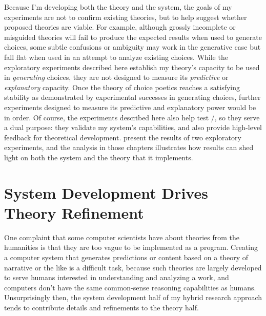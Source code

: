 Because I'm developing both the theory and the system, the goals of my experiments are not to confirm existing theories, but to help suggest whether proposed theories are viable.
%
For example, although grossly incomplete or misguided theories will fail to produce the expected results when used to generate choices, some subtle confusions or ambiguity may work in the generative case but fall flat when used in an attempt to analyze existing choices.
%
While the exploratory experiments described here establish my theory's capacity to be used in \emph{generating} choices, they are not designed to measure its \emph{predictive} or \emph{explanatory} capacity.
%
Once the theory of choice poetics reaches a satisfying stability as demonstrated by experimental successes in generating choices, further experiments designed to measure its predictive and explanatory power would be in order.
%
Of course, the experiments described here also help test \dunyazad/, so they serve a dual purpose: they validate my system's capabilities, and also provide high-level feedback for theoretical development.
%
 present the results of two exploratory experiments, and the analysis in those chapters illustrates how results can shed light on both the system and the theory that it implements.

\section{System Development Drives Theory Refinement}


One complaint that some computer scientists have about theories from the humanities is that they are too vague to be implemented as a program.
%
Creating a computer system that generates predictions or content based on a theory of narrative or the like is a difficult task, because such theories are largely developed to serve humans interested in understanding and analyzing a work, and computers don't have the same common-sense reasoning capabilities as humans.
%
Unsurprisingly then, the system development half of my hybrid research approach tends to contribute details and refinements to the theory half.


